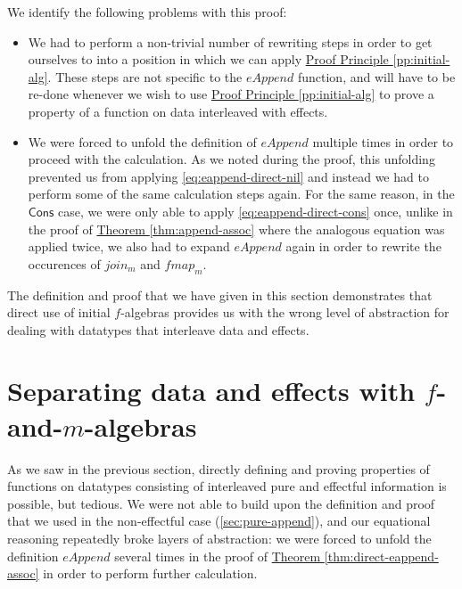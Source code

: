 \documentclass{jfp1}
\newcommand{\proofprinref}[1]{\hyperref[#1]{Proof Principle \ref*{#1}}}
\newcommand{\thmref}[1]{\hyperref[#1]{Theorem \ref*{#1}}}
\begin{document}
We identify the following problems with this proof:
\begin{itemize}
\item We had to perform a non-trivial number of rewriting steps in
  order to get ourselves to into a position in which we can apply
  \proofprinref{pp:initial-alg}. These steps are not specific to the
  $\mathit{eAppend}$ function, and will have to be re-done whenever we
  wish to use \proofprinref{pp:initial-alg} to prove a property of a
  function on data interleaved with effects.
\item We were forced to unfold the definition of $\mathit{eAppend}$
  multiple times in order to proceed with the calculation. As we noted
  during the proof, this unfolding prevented us from applying
  \autoref{eq:eappend-direct-nil} and instead we had to perform some
  of the same calculation steps again. For the same reason, in the
  $\mathsf{Cons}$ case, we were only able to apply
  \autoref{eq:eappend-direct-cons} once, unlike in the proof of
  \thmref{thm:append-assoc} where the analogous equation was applied
  twice, we also had to expand $\mathit{eAppend}$ again in order to
  rewrite the occurences of $\mathit{join_m}$ and $\mathit{fmap_m}$.
\end{itemize}
The definition and proof that we have given in this section
demonstrates that direct use of initial $f$-algebras provides us with
the wrong level of abstraction for dealing with datatypes that
interleave data and effects.

\section{Separating data and effects with $f$-and-$m$-algebras}
\label{sec:f-and-m-algebras}

As we saw in the previous section, directly defining and proving
properties of functions on datatypes consisting of interleaved pure
and effectful information is possible, but tedious. We were not able
to build upon the definition and proof that we used in the
non-effectful case (\autoref{sec:pure-append}), and our equational
reasoning repeatedly broke layers of abstraction: we were forced to
unfold the definition $\mathit{eAppend}$ several times in the proof of
\thmref{thm:direct-eappend-assoc} in order to perform further
calculation.
\end{document}
